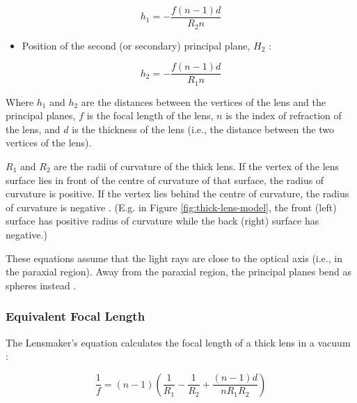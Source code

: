 \begin{equation} \label{eq:thick-first-principal-plane}
    h_1 = -\frac{f(n-1)d}{R_2 n}
\end{equation}

\begin{itemize}
    \item Position of the second (or secondary) principal plane, $H_2$ \cite{Nave2017}:
\end{itemize}

\begin{equation} \label{eq:thick-second-principal-plane}
    h_2 = -\frac{f(n-1)d}{R_1 n}
\end{equation}

Where $h_1$ and $h_2$ are the distances between the vertices of the lens and the principal planes, $f$ is the focal length of the lens, $n$ is the index of refraction of the lens, and $d$ is the thickness of the lens (i.e., the distance between the two vertices of the lens).

$R_1$ and $R_2$ are the radii of curvature of the thick lens. If the vertex of the lens surface lies in front of the centre of curvature of that surface, the radius of curvature is positive. If the vertex lies behind the centre of curvature, the radius of curvature is negative \cite{Serbanescu2013}. (E.g. in Figure \ref{fig:thick-lens-model}, the front (left) surface has positive radius of curvature while the back (right) surface has negative.)

These equations assume that the light rays are close to the optical axis (i.e., in the paraxial region). Away from the paraxial region, the principal planes bend as spheres instead \cite{noauthor-2021}.

\subsubsection{Equivalent Focal Length}



The Lensmaker's equation calculates the focal length of a thick lens in a vacuum \cite{Jones2013, Boundless_undated-to, Nave2017}:

\begin{equation}
    \frac{1}{f} = (n-1)\left( \frac{1}{R_1}-\frac{1}{R_2}+\frac{(n-1)d}{n R_1 R_2} \right)
\end{equation}

